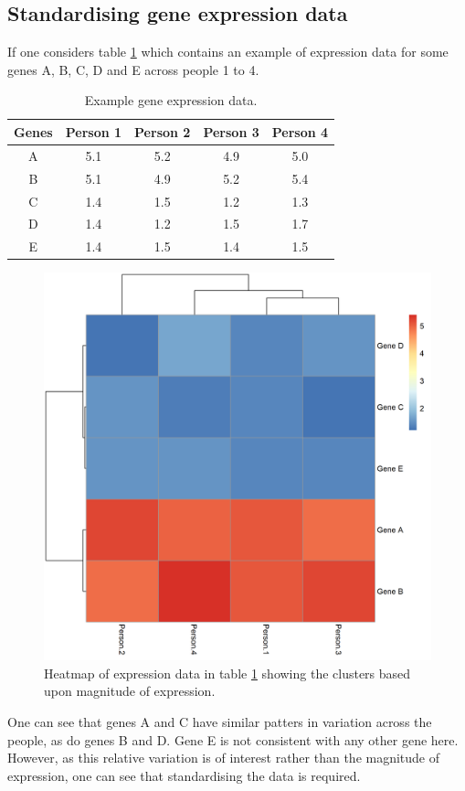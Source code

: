 \documentclass[14pt]{extarticle} %
\begin{document}
\subsection{Standardising gene expression data} \label{sec:motivating_example_standardisation}
If one considers table \ref{table:example_gene_expression_data} which contains an example of expression data for some genes A, B, C, D and E across people 1 to 4.
\begin{table}[!htb] 
	\centering
	\begin{tabular}{c|cccc} 
		Genes 	& Person 1	& Person 2	& Person 3	& Person 4	\\ 
		\hline
		A 		& 5.1		& 5.2 		& 4.9		& 5.0		\\
		B 		& 5.1		& 4.9		& 5.2		& 5.4		\\
		C 		& 1.4		& 1.5		& 1.2		& 1.3		\\
		D 		& 1.4		& 1.2		& 1.5		& 1.7		\\
		E 		& 1.4		& 1.5		& 1.4		& 1.5		
	\end{tabular}
	\caption{Example gene expression data.}
	\label{table:example_gene_expression_data}
\end{table}
\begin{figure}[!htb]
	\centering
	\includegraphics[scale=0.55]{Images/Examples/example_expression_data.png}
	\caption{Heatmap of expression data in table \ref{table:example_gene_expression_data} showing the clusters based upon magnitude of expression.}
	\label{fig:example_expression_data}
\end{figure}
One can see that genes A and C have similar patters in variation across the people, as do genes B and D. Gene E is not consistent with any other gene here. However, as this relative variation is of interest rather than the magnitude of expression, one can see that standardising the data is required. 
\end{document}
